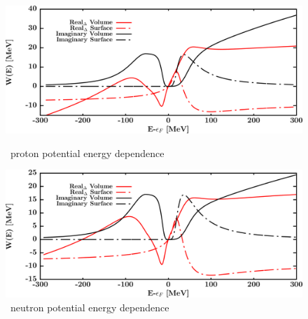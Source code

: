 \begin{figure}[hbtp]
    \centering
    \begin{minipage}{0.42\textwidth}
        \centering
        \includegraphics[width=\textwidth]{figures/ca48_protonPotentials.png}
        \caption*{\footnotesize\caEight\ proton potential energy dependence}
        \label{DOMFitData_ca48_proton_potentialComponent_energy}
    \end{minipage}\hspace{6pt}
    \begin{minipage}{0.42\textwidth}
        \centering
        \includegraphics[width=\textwidth]{figures/ca48_neutronPotentials.png}
        \caption*{\footnotesize\caEight\ neutron potential energy dependence}
        \label{DOMFitData_ca48_neutron_potentialComponent_energy}
    \end{minipage}
\end{figure}
